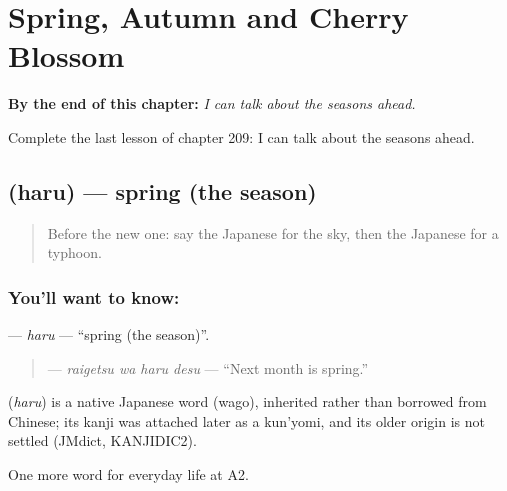 
\chapter{Spring, Autumn and Cherry Blossom}
\label{ch:ja-spring-autumn-and-cherry-blossom}

\begin{chapteropening}
\textbf{By the end of this chapter:} \emph{I can talk about the seasons ahead.}

Complete the last lesson of chapter 209: I can talk about the seasons ahead.
\end{chapteropening}

\section[\texorpdfstring{\ja{はる} (haru)}{はる (haru)}]{ (haru) — spring (the season)}

\label{lesson:JA-C209-haru}



\begin{quote}
Before the new one: say the Japanese for the sky, then the Japanese for a typhoon.
\end{quote}

\subsection*{You'll want to know: }
\textbf{} — \emph{haru} — \textquotedblleft{}spring (the season)\textquotedblright{}.

\begin{quote}
\textbf{ } — \emph{raigetsu wa haru desu} — \textquotedblleft{}Next month is spring.\textquotedblright{}
\end{quote}

\begin{cousinweb}
\textbf{} (\emph{haru}) is a native Japanese word (wago), inherited rather than borrowed from Chinese; its kanji was attached later as a kun'yomi, and its older origin is not settled (JMdict, KANJIDIC2).
\end{cousinweb}

\begin{grammarlens}[title={What you've built}]
One more word for everyday life at A2.
\end{grammarlens}

